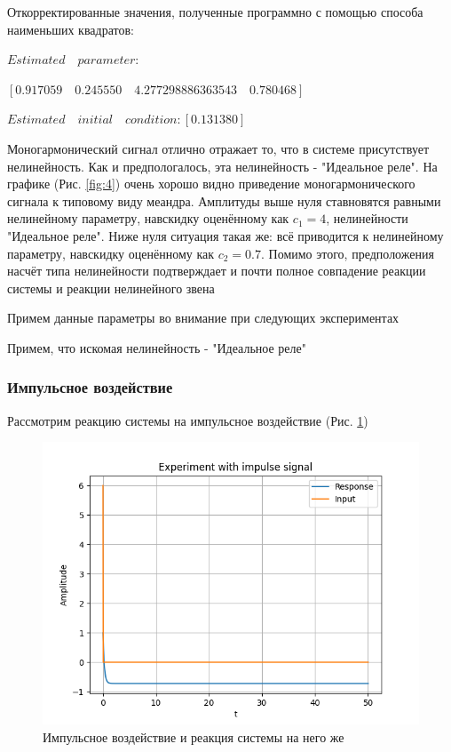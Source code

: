 Откорректированные значения, полученные программно с помощью способа наименьших квадратов:

$Estimated\quad parameter:$

\qquad$[0.917059\quad 0.245550\quad 4.277298886363543\quad 0.780468]$

$Estimated\quad initial\quad condition: [0.131380]$

Моногармонический сигнал отлично отражает то, что в системе присутствует нелинейность. Как и предпологалось, эта нелинейность - "Идеальное реле".
На графике (Рис. \ref{fig:4}) очень хорошо видно приведение моногармонического сигнала к типовому виду меандра. Амплитуды выше нуля ставновятся равными
нелинейному параметру, навскидку оценённому как $ c_1 = 4 $, нелинейности "Идеальное реле". Ниже нуля ситуация такая же: всё приводится к нелинейному параметру, навскидку оценённому как $ c_2 = 0.7 $.
Помимо этого, предположения насчёт типа нелинейности подтверждает и почти полное совпадение реакции системы и реакции нелинейного звена

Примем данные параметры во внимание при следующих экспериментах

Примем, что искомая нелинейность - "Идеальное реле"

\subsubsection{Импульсное воздействие}
Рассмотрим реакцию системы на импульсное воздействие (Рис. \ref{fig:5})

\begin{figure}[H]
	\centering
	\includegraphics[width=0.8\linewidth]{body/images/Experiment-with-impulse-signal.png}
	\caption{Импульсное воздействие и реакция системы на него же}
	\label{fig:5}
\end{figure}

